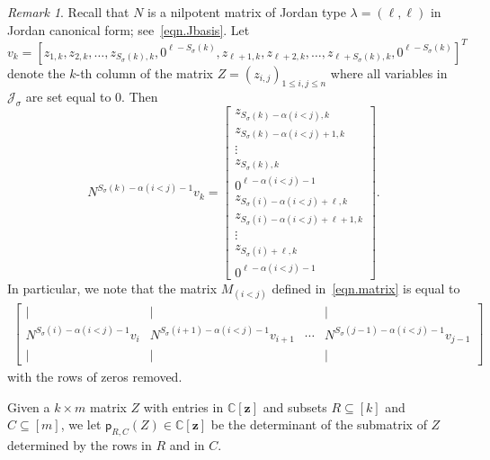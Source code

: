 \documentclass[11pt]{amsart}
\theoremstyle{remark}
\newtheorem{remark}[theorem]{Remark}
\theoremstyle{remark}
\theoremstyle{definition}
\theoremstyle{definition}
\theoremstyle{definition}
\numberwithin{equation}{section}
\newcommand{\C}{\mathbb{C}}           %
\newcommand{\gs}{\sigma}
\newcommand{\cj}{\mathcal{J}}
\newcommand{\al}{\alpha}
\newcommand{\pl}{\mathsf{p}}
\begin{document}
\begin{remark}\label{rem.evaluation} Recall that $N$ is a nilpotent matrix of Jordan type $\lambda=(\ell, \ell)$ in Jordan canonical form; see~\eqref{eqn.Jbasis}. Let 
\[
v_k = \left[z_{1,k}, z_{2,k}, \ldots, z_{S_\gs(k),k}, 0^{\ell-S_\gs(k)}, z_{\ell+1,k}, z_{\ell+2,k}, \ldots, z_{\ell+S_\gs(k),k}, 0^{\ell-S_\gs(k)}\right]^T
\] 
denote the $k$-th column of the matrix $Z=(z_{i,j})_{1\leq i,j\leq n}$ where all variables in $\cj_\gs$ are set equal to $0$.   Then 
\[
N^{S_{\gs}(k)-\al(i<j)-1}v_k = \begin{bmatrix} z_{S_\gs(k)-\al(i<j), k}\\ z_{S_\gs(k)-\al(i<j)+1, k}\\ \vdots\\ z_{S_\gs(k), k}\\ 0^{\ell - \al(i<j)-1} \\ z_{S_\gs(i)-\al(i<j)+\ell, k}\\ z_{S_\gs(i)-\al(i<j)+\ell+1, k}\\ \vdots\\ z_{S_\gs(i)+\ell, k}\\ 0^{\ell - \al(i<j)-1} \end{bmatrix} .
\]
In particular, we note that the matrix $M_{(i<j)}$ defined in~\eqref{eqn.matrix} is equal to 
\begin{eqnarray*}
\begin{bmatrix}  | & | &  & |  \\   N^{S_\gs(i)-\al(i<j)-1}v_i &  N^{S_\gs(i+1)-\al(i<j)-1}v_{i+1} & \cdots &  N^{S_\gs(j-1)-\al(i<j)-1}v_{j-1} \\ | & | &  & |   \end{bmatrix}
\end{eqnarray*}
with the rows of zeros removed.    
\end{remark}

Given a $k\times m$ matrix $Z$ with entries in $\C[\mathbf{z}]$ and subsets $R\subseteq [k]$ and $C\subseteq [m]$, we let $\pl_{R,C}(Z)\in \C[\mathbf{z}]$ be the determinant  of the submatrix of $Z$ determined by the rows in $R$ and in $C$. 
\end{document}
